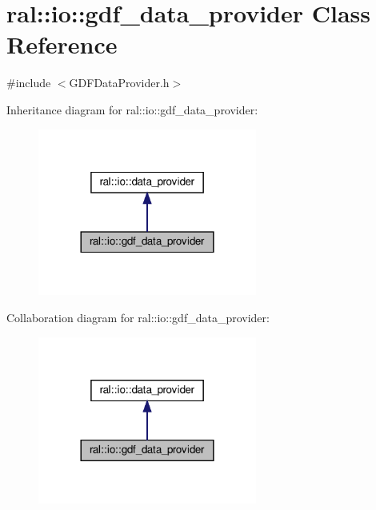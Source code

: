 \hypertarget{classral_1_1io_1_1gdf__data__provider}{}\section{ral\+:\+:io\+:\+:gdf\+\_\+data\+\_\+provider Class Reference}
\label{classral_1_1io_1_1gdf__data__provider}


{\ttfamily \#include $<$G\+D\+F\+Data\+Provider.\+h$>$}



Inheritance diagram for ral\+:\+:io\+:\+:gdf\+\_\+data\+\_\+provider\+:\nopagebreak
\begin{figure}[H]
\begin{center}
\leavevmode
\includegraphics[width=204pt]{classral_1_1io_1_1gdf__data__provider__inherit__graph}
\end{center}
\end{figure}


Collaboration diagram for ral\+:\+:io\+:\+:gdf\+\_\+data\+\_\+provider\+:\nopagebreak
\begin{figure}[H]
\begin{center}
\leavevmode
\includegraphics[width=204pt]{classral_1_1io_1_1gdf__data__provider__coll__graph}
\end{center}
\end{figure}
